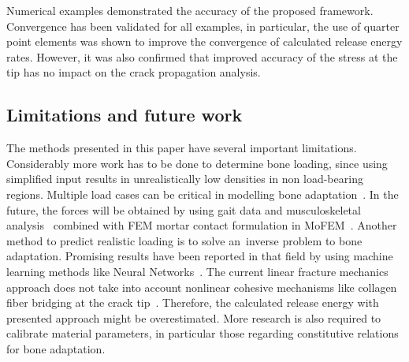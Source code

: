 \documentclass[review]{elsarticle}
\numberwithin{equation}{section}
\begin{document}
Numerical examples demonstrated the accuracy of the proposed framework. 
Convergence has been validated for all examples, in particular, the use of quarter point elements was shown to improve the convergence of calculated release energy rates. However, it was also confirmed that improved accuracy of the stress at the tip has no impact on the crack propagation analysis.
\subsection{Limitations and future work}
The methods presented in this paper have several important limitations. 
Considerably more work has to be done to determine bone loading, since using simplified input results in unrealistically low densities in non load-bearing regions. 
Multiple load cases can be critical in modelling bone adaptation~\citep{geraldes2016consideration}. 
In the future, the forces will be obtained by using gait data and musculoskeletal analysis~\citep{Delp2007} combined with FEM mortar contact formulation in MoFEM~\citep{athanasiadis2018mortar}. 
Another method to predict realistic loading is to solve an~inverse problem to bone adaptation. 
Promising results have been reported in that field by using machine learning methods like Neural Networks~\citep{campoli2012computational}. 
The current linear fracture mechanics approach does not take into account nonlinear cohesive mechanisms like collagen fiber bridging at the crack tip~\citep{yang2006fracture}. 
Therefore, the calculated release energy with presented approach might be overestimated. 
More research is also required to calibrate material parameters, in particular those regarding constitutive relations for bone adaptation. 





\end{document}
